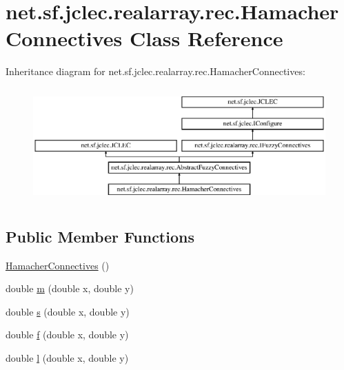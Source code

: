 \hypertarget{classnet_1_1sf_1_1jclec_1_1realarray_1_1rec_1_1_hamacher_connectives}{\section{net.\-sf.\-jclec.\-realarray.\-rec.\-Hamacher\-Connectives Class Reference}
\label{classnet_1_1sf_1_1jclec_1_1realarray_1_1rec_1_1_hamacher_connectives}
}
Inheritance diagram for net.\-sf.\-jclec.\-realarray.\-rec.\-Hamacher\-Connectives\-:\begin{figure}[H]
\begin{center}
\leavevmode
\includegraphics[height=4.416404cm]{classnet_1_1sf_1_1jclec_1_1realarray_1_1rec_1_1_hamacher_connectives}
\end{center}
\end{figure}
\subsection*{Public Member Functions}
\begin{DoxyCompactItemize}
\item 
\hyperlink{classnet_1_1sf_1_1jclec_1_1realarray_1_1rec_1_1_hamacher_connectives_aae2507132704e7bbb14ffd649870db81}{Hamacher\-Connectives} ()
\item 
double \hyperlink{classnet_1_1sf_1_1jclec_1_1realarray_1_1rec_1_1_hamacher_connectives_a16393c8631fb168cb1f96e97d25a8f66}{m} (double x, double y)
\item 
double \hyperlink{classnet_1_1sf_1_1jclec_1_1realarray_1_1rec_1_1_hamacher_connectives_a7fefc2c105fd461d4bbffaac4517757b}{s} (double x, double y)
\item 
double \hyperlink{classnet_1_1sf_1_1jclec_1_1realarray_1_1rec_1_1_hamacher_connectives_acbadd41e4e06806efe0d9fd09ba2b735}{f} (double x, double y)
\item 
double \hyperlink{classnet_1_1sf_1_1jclec_1_1realarray_1_1rec_1_1_hamacher_connectives_ac44ac40cd08d0974516a2d77509552e4}{l} (double x, double y)
\end{DoxyCompactItemize}


